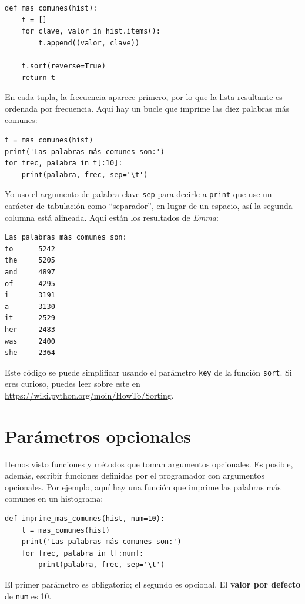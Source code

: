 \documentclass[10pt]{book}
\begin{document}
\begin{verbatim}
def mas_comunes(hist):
    t = []
    for clave, valor in hist.items():
        t.append((valor, clave))

    t.sort(reverse=True)
    return t
\end{verbatim}

En cada tupla, la frecuencia aparece primero, por lo que la lista resultante es
ordenada por frecuencia.  Aquí hay un bucle que imprime las diez palabras más
comunes:

\begin{verbatim}
t = mas_comunes(hist)
print('Las palabras más comunes son:')
for frec, palabra in t[:10]:
    print(palabra, frec, sep='\t')
\end{verbatim}
%
Yo uso el argumento de palabra clave {\tt sep} para decirle a {\tt print} que use un
carácter de tabulación como ``separador'', en lugar de un espacio, así la segunda
columna está alineada.  Aquí están los resultados de {\em Emma}:

\begin{verbatim}
Las palabras más comunes son:
to      5242
the     5205
and     4897
of      4295
i       3191
a       3130
it      2529
her     2483
was     2400
she     2364
\end{verbatim}
%
Este código se puede simplificar usando el parámetro {\tt key} de
la función {\tt sort}.  Si eres curioso, puedes leer sobre este
en \url{https://wiki.python.org/moin/HowTo/Sorting}.


\section{Parámetros opcionales}

Hemos visto funciones y métodos que toman argumentos
opcionales.  Es posible, además, escribir funciones definidas por el programador
con argumentos opcionales.  Por ejemplo, aquí hay una función que
imprime las palabras más comunes en un histograma:

\begin{verbatim}
def imprime_mas_comunes(hist, num=10):
    t = mas_comunes(hist)
    print('Las palabras más comunes son:')
    for frec, palabra in t[:num]:
        print(palabra, frec, sep='\t')
\end{verbatim}

El primer parámetro es obligatorio; el segundo es opcional.
El {\bf valor por defecto} de {\tt num} es 10.
\end{document}
